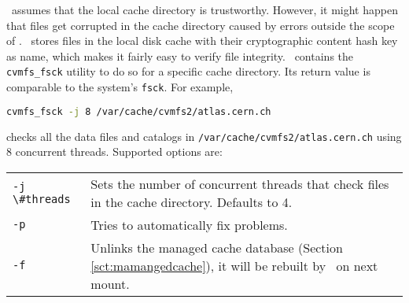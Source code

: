 \cvmfs\ assumes that the local cache directory is trustworthy.
However, it might happen that files get corrupted in the cache directory caused by errors outside the scope of \cvmfs.
\cvmfs\ stores files in the local disk cache with their cryptographic content hash key as name, which makes it fairly easy to verify file integrity.
\cvmfs\ contains the \texttt{cvmfs\_fsck} utility to do so for a specific cache directory. 
Its return value is comparable to the system's \texttt{fsck}.
For example,
\begin{lstlisting}[language=bash]
cvmfs_fsck -j 8 /var/cache/cvmfs2/atlas.cern.ch
\end{lstlisting}
checks all the data files and catalogs in \texttt{/var/cache/cvmfs2/atlas.cern.ch} using 8 concurrent threads.  
Supported options are:

\begin{tabularx}{\linewidth}{lX}
	\lstinline{-j \#threads} & Sets the number of concurrent threads that check files in the cache directory. Defaults to 4. \\
	\lstinline{-p} & Tries to automatically fix problems. \\
	\lstinline{-f} & Unlinks the managed cache database (\cf Section \ref{sct:mamangedcache}), \ie it will be rebuilt by \cvmfs\ on next mount.\\
\end{tabularx}

